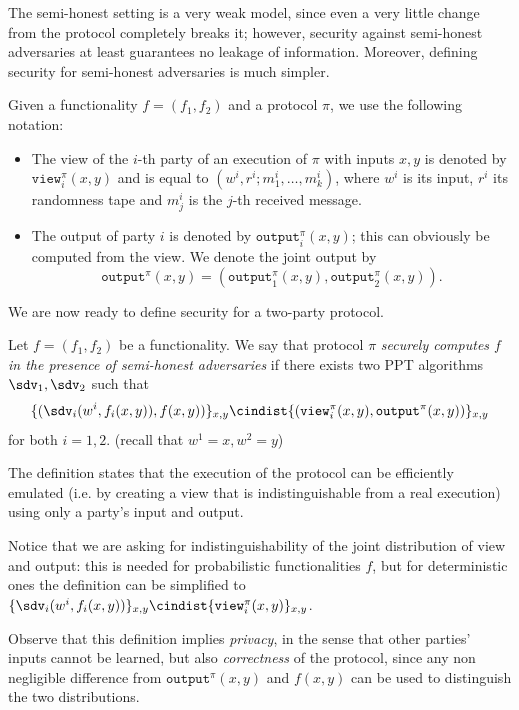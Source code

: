 The semi-honest setting is a very weak model, since even a very little change from the protocol completely breaks it; however, security against semi-honest adversaries at least guarantees no leakage of information. Moreover, defining security for semi-honest adversaries is much simpler.

Given a functionality $f=(f_1,f_2)$ and a protocol $\pi$, we use the following notation:
\begin{itemize}
    \item The view of the $i$-th party of an execution of $\pi$ with inputs $x,y$ is denoted by $\texttt{view}_i^\pi(x,y)$ and is equal to $(w^i,r^i;m_1^i,\dots,m_k^i)$, where $w^i$ is its input, $r^i$ its randomness tape and $m_j^i$ is the $j$-th received message.
    \item The output of party $i$ is denoted by $\texttt{output}_i^\pi(x,y)$; this can obviously be computed from the view. We denote the joint output by $$\texttt{output}^\pi(x,y)=(\texttt{output}_1^\pi(x,y),\texttt{output}_2^\pi(x,y)).$$
\end{itemize}

We are now ready to define security for a two-party protocol.
\begin{definition}
    Let $f=(f_1,f_2)$ be a functionality. We say that protocol $\pi$ \emph{securely computes $f$ in the presence of semi-honest adversaries} if there exists two PPT algorithms $\sdv_1,\sdv_2$ such that
    $$ \{ (\sdv_i(w^i,f_i(x,y)), f(x,y) ) \}_{x,y} \cindist \{ (\texttt{view}_i^\pi(x,y), \texttt{output}^\pi(x,y)) \}_{x,y} $$
    for both $i=1,2$. (recall that $w^1=x,w^2=y$)
\end{definition}

The definition states that the execution of the protocol can be efficiently emulated (i.e. by creating a view that is indistinguishable from a real execution) using only a party's input and output.

Notice that we are asking for indistinguishability of the joint distribution of view and output: this is needed for probabilistic functionalities $f$, but for deterministic ones the definition can be simplified to $ \{ \sdv_i(w^i,f_i(x,y)) \}_{x,y} \cindist \{ \texttt{view}_i^\pi(x,y) \}_{x,y} $.

Observe that this definition implies \emph{privacy}, in the sense that other parties' inputs cannot be learned, but also \emph{correctness} of the protocol, since any non negligible difference from $\texttt{output}^\pi(x,y)$ and $f(x,y)$ can be used to distinguish the two distributions.

